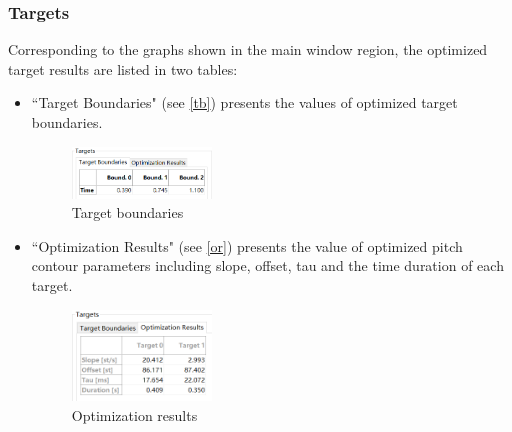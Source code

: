 \subsubsection*{ Targets}
Corresponding to the graphs shown in the main window region, the optimized target results are listed in two tables:
\begin{itemize}
	\item ``Target Boundaries" (see \autoref{tb}) presents the values of optimized target boundaries.
	\begin{figure}[H]
	\centering
	\includegraphics[width=0.35\textwidth]{images/target boundaries.png}
	\caption{Target boundaries}
	\label{tb}
	\end{figure}
	\item ``Optimization Results" (see \autoref{or}) presents the value of optimized pitch contour parameters including slope, offset, tau and the time duration of each target.
	\begin{figure}[H]
	\centering
	\includegraphics[width=0.35\textwidth]{images/optimization results.png}
	\caption{Optimization results}
	\label{or}
	\end{figure}
\end{itemize}

